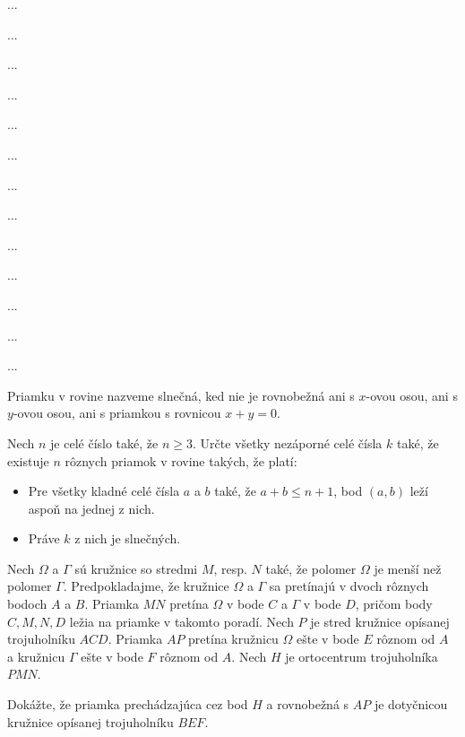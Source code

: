 {%
...}

{%
...}

{%
...}

{%
...}

{%
...}

{%
...}

{%
...}

{%
...}

{%
...}

{%
...}

{%
...}

{%
...}

{%
...}

{%
Priamku v rovine nazveme slnečná, ked nie je rovnobežná ani s $x$-ovou osou, ani s $y$-ovou osou, ani s priamkou s rovnicou $x+y=0$.

Nech $n$ je celé číslo také, že $n \geqslant 3$. Určte všetky nezáporné celé čísla $k$ také, že existuje $n$ rôznych priamok v rovine takých, že platí:
\begin{itemize}
\item Pre všetky kladné celé čísla $a$ a $b$ také, že $a+b \leq n+1$, bod $(a, b)$ leží aspoň na jednej z nich.
\item Práve $k$ z nich je slnečných.
\end{itemize}
}

{%
Nech $\Omega$ a $\Gamma$ sú kružnice so stredmi $M$, resp. $N$ také, že polomer $\Omega$ je menší než polomer $\Gamma$. Predpokladajme, že kružnice $\Omega$ a $\Gamma$ sa pretínajú v dvoch rôznych bodoch $A$ a $B$. Priamka $M N$ pretína $\Omega$ v bode $C$ a $\Gamma$ v bode $D$, pričom body $C, M, N, D$ ležia na priamke v takomto poradí. Nech $P$ je stred kružnice opísanej trojuholníku $A C D$. Priamka $A P$ pretína kružnicu $\Omega$ ešte v bode $E$ rôznom od $A$ a kružnicu $\Gamma$ ešte v bode $F$ rôznom od $A$. Nech $H$ je ortocentrum trojuholníka $PMN$.

Dokážte, že priamka prechádzajúca cez bod $H$ a rovnobežná s $A P$ je dotyčnicou kružnice opísanej trojuholníku $B E F$.
}

